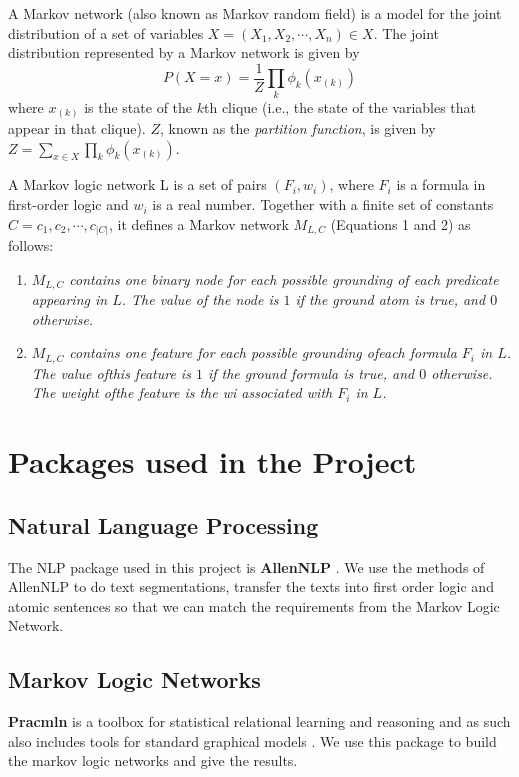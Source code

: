 \documentclass[
12pt, %
a4paper, %
oneside, %
headinclude,footinclude, %
BCOR5mm, %
]{scrartcl}
\begin{document}
A Markov network (also known as Markov random field) is a model for the joint distribution of a set of variables $X = (X_1,X_2,\cdots,X_n) \in X$. The joint distribution represented by a Markov network is given by
\begin{equation}
    P(X=x)=\frac{1}{Z}\prod_k\phi_k(x_{(k)})
\end{equation}
where $x_{(k)}$ is the state of the $k$th clique (i.e., the state of the variables that appear in that clique). $Z$, known as the \textit{partition function}, is given by $Z=\sum_{x\in X}\prod_k\phi_k(x_{(k)})$.
\begin{definition}
    A Markov logic network L is a set of pairs $(F_i, w_i)$, where $F_i$ is a formula in first-order logic and $w_i$ is a real number. Together with a finite set of constants $C = {c_1,c_2,\cdots,c_{|C|}}$, it defines a Markov network $M_{L,C}$ (Equations 1 and 2) as follows:
\end{definition}

\begin{enumerate}[noitemsep] %
    \item \textit{$M_{L,C}$ contains one binary node for each possible grounding of each predicate appearing in $L$. The value of the node is $1$ if the ground atom is true, and $0$ otherwise.}
    \item \textit{$M_{L,C}$ contains one feature for each possible grounding ofeach formula $F_i$ in $L$. The value ofthis feature is $1$ if the ground formula is true, and $0$ otherwise. The weight ofthe feature is the wi associated with $F_i$ in $L$.}
\end{enumerate}


\clearpage


\section{Packages used in the Project}
\subsection{Natural Language Processing}
The NLP package used in this project is \textbf{AllenNLP} \cite{Gardner2017AllenNLP}. We use the methods of AllenNLP to do text segmentations, transfer the texts into first order logic and atomic sentences so that we can match the requirements from the Markov Logic Network.

\subsection{Markov Logic Networks}
\textbf{Pracmln} is a toolbox for statistical relational learning and reasoning and as such also includes tools for standard graphical models \cite{pracmln}. We use this package to build the markov logic networks and give the results.
\end{document}
